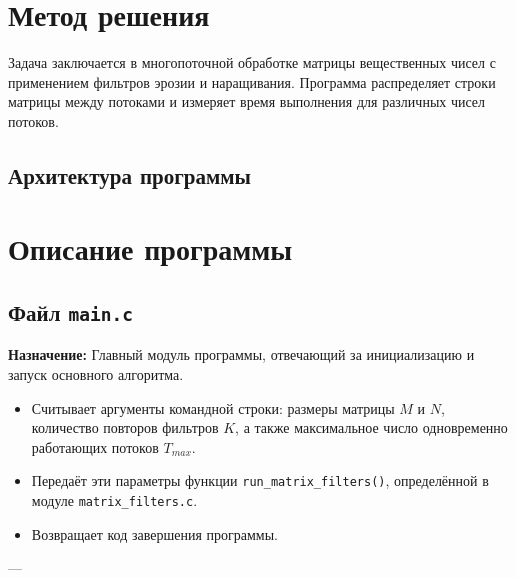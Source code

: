 \section{Метод решения}
Задача заключается в многопоточной обработке матрицы вещественных чисел с применением фильтров эрозии и наращивания. 
Программа распределяет строки матрицы между потоками и измеряет время выполнения для различных чисел потоков.

\subsection*{Архитектура программы}
\vspace{5mm}

\section{Описание программы}

\subsection*{Файл \texttt{main.c}}
\textbf{Назначение:}  
Главный модуль программы, отвечающий за инициализацию и запуск основного алгоритма.

\begin{itemize}
    \item Считывает аргументы командной строки: размеры матрицы $M$ и $N$, количество повторов фильтров $K$, а также максимальное число одновременно работающих потоков $T_{max}$.
    \item Передаёт эти параметры функции \texttt{run\_matrix\_filters()}, определённой в модуле \texttt{matrix\_filters.c}.
    \item Возвращает код завершения программы.
\end{itemize}

---

